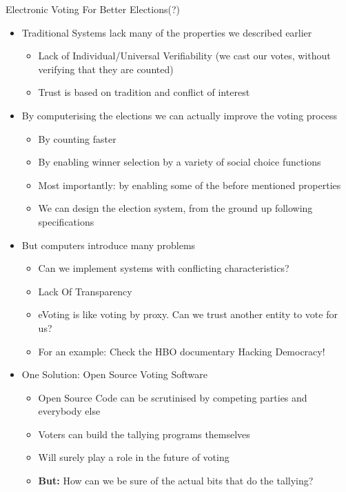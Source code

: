 \documentclass{beamer}
\begin{document}
\begin{frame}[allowframebreaks]{Electronic Voting For Better Elections(?)}
\begin{itemize}

\item Traditional Systems lack many of the properties we described earlier
\begin{itemize}
\item Lack of Individual/Universal Verifiability (we cast our votes, without verifying that they are counted)
\item Trust is based on tradition and conflict of interest
\end{itemize}

\item By computerising the elections we can actually improve the voting process
\begin{itemize}
\item By counting faster
\item By enabling winner selection by a variety of social choice functions
\item Most importantly: by enabling some of the before mentioned properties
\item We can design the election system, from the ground up following specifications
\end{itemize}

\item But computers introduce many problems 
\begin{itemize}
\item Can we implement systems with conflicting characteristics?
\item Lack Of Transparency
\item eVoting is like voting by proxy. Can we trust another entity to vote for us?
\item For an example: Check the HBO  documentary Hacking Democracy!
\end{itemize}


\framebreak

\item One Solution: Open Source Voting Software
\begin{itemize}
\item Open Source Code can be scrutinised by competing parties and everybody else
\item Voters can build the tallying programs themselves
\item Will surely play a role in the future of voting
\item \textbf{But:} How can we be sure of the actual bits that do the tallying?
\end{itemize}


\end{itemize}
\end{frame}
\end{document}

